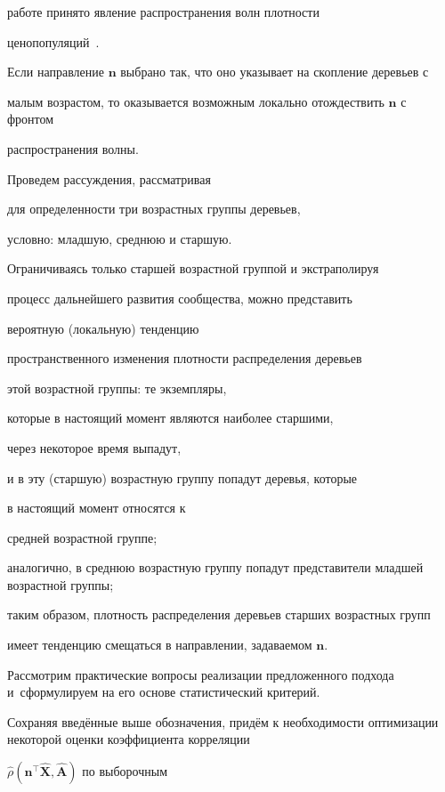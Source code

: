 работе принято явление распространения волн плотности 

ценопопуляций~\cite{kislovbr:bib:kolmogorov,kislovbr:bib:sviregev}.

Если направление $\mathbf{n}$  выбрано так, что оно указывает на скопление деревьев с 

малым возрастом, то оказывается возможным локально отождествить $\mathbf{n}$ с фронтом 

распространения волны. 



Проведем рассуждения, рассматривая 

для определенности три возрастных группы деревьев,

условно: младшую, среднюю и старшую. 

Ограничиваясь только старшей возрастной группой и экстраполируя

процесс дальнейшего развития сообщества, можно представить 

вероятную (локальную) тенденцию 

пространственного изменения плотности распределения деревьев 

этой возрастной группы: те экземпляры, 

которые в настоящий момент являются наиболее старшими,  

через некоторое время выпадут, 

и в эту (старшую) возрастную группу попадут деревья, которые 

в настоящий момент относятся к 

средней возрастной группе;  

аналогично, в среднюю возрастную группу попадут представители младшей возрастной группы;

таким образом, плотность распределения деревьев старших возрастных групп 

имеет тенденцию смещаться в направлении, задаваемом $\mathbf{n}$. 





Рассмотрим практические вопросы реализации предложенного подхода и~сформулируем на его основе статистический критерий. 



Сохраняя введённые выше обозначения,  придём к необходимости оптимизации некоторой оценки коэффициента корреляции 

$\hat{\rho}(\mathbf{n}^\top \mathbf{\hat X},\mathbf{\hat A})$ по выборочным 

